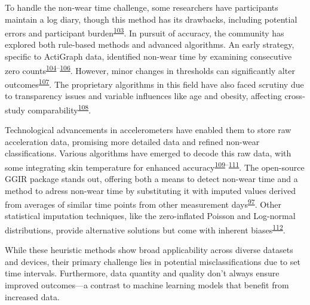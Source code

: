 \documentclass[
  10pt,
]{scrbook}
\begin{document}
To handle the non-wear time challenge, some researchers have
participants maintain a log diary, though this method has its drawbacks,
including potential errors and participant
burden\textsuperscript{\protect\hyperlink{ref-ainsworth_recommendations_2012}{103}}.
In pursuit of accuracy, the community has explored both rule-based
methods and advanced algorithms. An early strategy, specific to
ActiGraph data, identified non-wear time by examining consecutive zero
counts\textsuperscript{\protect\hyperlink{ref-hecht_methodology_2009}{104}--\protect\hyperlink{ref-troiano_how_2020}{106}}.
However, minor changes in thresholds can significantly alter
outcomes\textsuperscript{\protect\hyperlink{ref-aadland_comparison_2018}{107}}.
The proprietary algorithms in this field have also faced scrutiny due to
transparency issues and variable influences like age and obesity,
affecting cross-study
comparability\textsuperscript{\protect\hyperlink{ref-toftager_accelerometer_2013}{108}}.

Technological advancements in accelerometers have enabled them to store
raw acceleration data, promising more detailed data and refined non-wear
classifications. Various algorithms have emerged to decode this raw
data, with some integrating skin temperature for enhanced
accuracy\textsuperscript{\protect\hyperlink{ref-duncan_wear-time_2018}{109}--\protect\hyperlink{ref-zhou_classification_2015}{111}}.
The open-source GGIR package stands out, offering both a means to detect
non-wear time and a method to adress non-wear time by substituting it
with imputed values derived from averages of similar time points from
other measurement
days\textsuperscript{\protect\hyperlink{ref-migueles_ggir_2019}{97}}.
Other statistical imputation techniques, like the zero-inflated Poisson
and Log-normal distributions, provide alternative solutions but come
with inherent
biases\textsuperscript{\protect\hyperlink{ref-lee_missing_2018}{112}}.

While these heuristic methods show broad applicability across diverse
datasets and devices, their primary challenge lies in potential
misclassifications due to set time intervals. Furthermore, data quantity
and quality don't always ensure improved outcomes---a contrast to
machine learning models that benefit from increased data.
\end{document}
